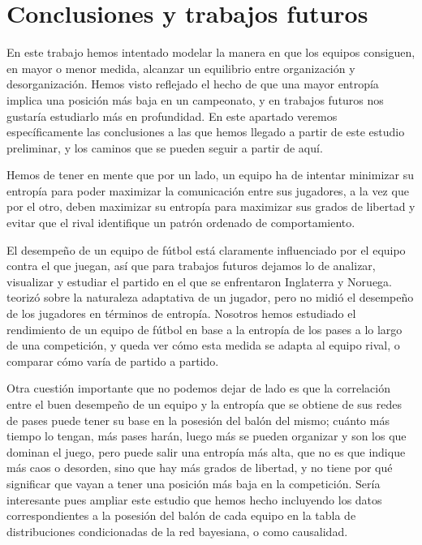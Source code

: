 \chapter{Conclusiones y trabajos futuros}
En este trabajo hemos intentado modelar la manera en que los equipos consiguen, en mayor o menor medida,
alcanzar un equilibrio entre organización y desorganización. Hemos visto reflejado el hecho de que una 
mayor entropía implica una posición más baja en un campeonato, y en trabajos futuros nos gustaría estudiarlo 
más en profundidad. En este apartado veremos específicamente las conclusiones a las que hemos llegado a partir 
de este estudio preliminar, y los caminos que se pueden seguir a partir de aquí.

Hemos de tener en mente que por un lado, un equipo ha de intentar minimizar su entropía para poder maximizar 
la comunicación entre sus jugadores, a la vez que por el otro, deben maximizar su entropía para maximizar sus 
grados de libertad y evitar que el rival identifique un patrón ordenado de comportamiento.
\cite{entropy-analysis}

El desempeño de un equipo de fútbol está claramente influenciado por el equipo contra el que juegan, así que para 
trabajos futuros dejamos lo de analizar, visualizar y estudiar el partido en el que se enfrentaron Inglaterra 
y Noruega. \cite{donogue} teorizó sobre la naturaleza adaptativa de un jugador, pero no midió el desempeño de los 
jugadores en términos de entropía. Nosotros hemos estudiado el rendimiento de un equipo de fútbol en base 
a la entropía de los pases a lo largo de una competición, y queda ver cómo esta medida se adapta al equipo 
rival, o comparar cómo varía de partido a partido.

Otra cuestión importante que no podemos dejar de lado es que la correlación entre el buen desempeño de un 
equipo y la entropía que se obtiene de sus redes de pases puede tener su base en la posesión del balón 
del mismo; cuánto más tiempo lo tengan, más pases harán, luego más se pueden organizar y son los que 
dominan el juego, pero puede salir una entropía más alta, que no es que indique más caos o desorden, 
sino que hay más grados de libertad, y no tiene por qué significar que vayan a tener una posición más baja en la 
competición. Sería interesante pues ampliar este estudio que hemos hecho 
incluyendo los datos correspondientes a la posesión del balón de cada equipo en la tabla de distribuciones 
condicionadas de la red bayesiana, o como causalidad.